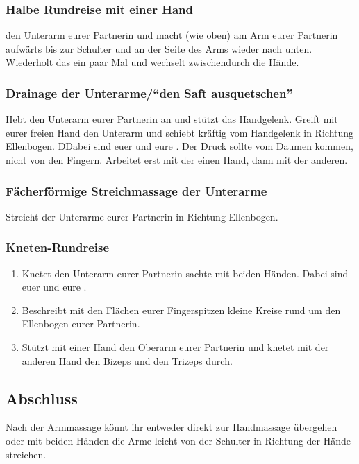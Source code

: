 \subsubsection{Halbe Rundreise mit einer Hand}
 den Unterarm eurer Partnerin und macht  (wie oben) am Arm eurer Partnerin aufwärts bis zur Schulter und an der Seite des Arms wieder nach unten. Wiederholt das ein paar Mal und wechselt zwischendurch die Hände.

\subsubsection{Drainage der Unterarme/"`den Saft ausquetschen"'}
Hebt den Unterarm eurer Partnerin an und stützt das Handgelenk. Greift mit eurer freien Hand den Unterarm und schiebt kräftig vom Handgelenk in Richtung Ellenbogen. DDabei sind euer  und eure . Der Druck sollte vom Daumen kommen, nicht von den Fingern. Arbeitet erst mit der einen Hand, dann mit der anderen.

\subsubsection{Fächerförmige Streichmassage der Unterarme}
Streicht  der Unterarme eurer Partnerin in Richtung Ellenbogen.

\subsubsection{Kneten-Rundreise}
\begin{oframed}
  \begin{enumerate}
    \item {} Knetet den Unterarm eurer Partnerin sachte mit beiden Händen. Dabei sind euer  und eure .
    \item {} Beschreibt mit den Flächen eurer Fingerspitzen kleine Kreise rund um den Ellenbogen eurer Partnerin.
    \item {} Stützt mit einer Hand den Oberarm eurer Partnerin und knetet mit der anderen Hand den Bizeps und den Trizeps durch.
  \end{enumerate}
\end{oframed}

\subsection{Abschluss}
Nach der Armmassage könnt ihr entweder direkt zur Handmassage übergehen oder mit beiden Händen die Arme leicht von der Schulter in Richtung der Hände streichen.

